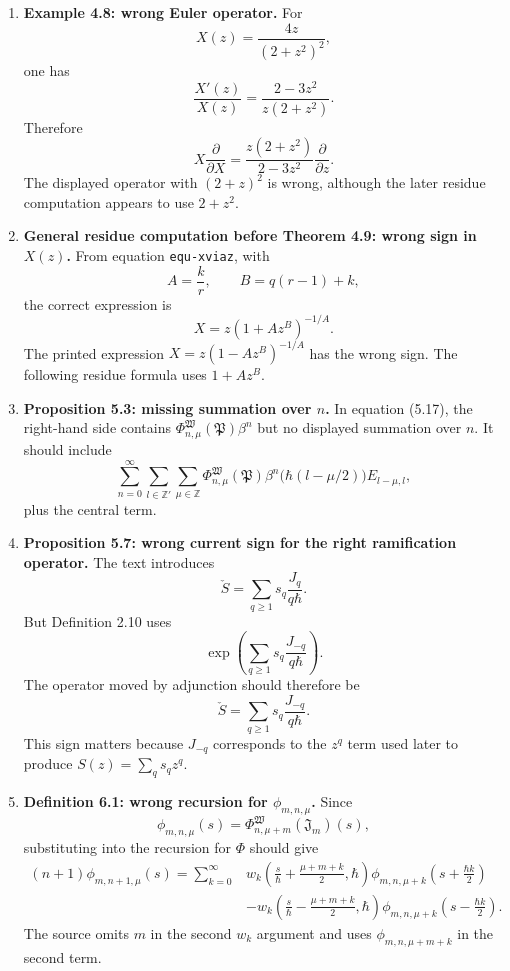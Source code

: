 \documentclass[11pt]{article}
\begin{document}
\begin{enumerate}[label=\textbf{\arabic*.}]
   \item \textbf{Example 4.8: wrong Euler operator.}
   For
   \[
      X(z)=\frac{4z}{(2+z^2)^2},
   \]
   one has
   \[
      \frac{X'(z)}{X(z)}
      =
      \frac{2-3z^2}{z(2+z^2)}.
   \]
   Therefore
   \[
      X\frac{\partial}{\partial X}
      =
      \frac{z(2+z^2)}{2-3z^2}
      \frac{\partial}{\partial z}.
   \]
   The displayed operator with $(2+z)^2$ is wrong, although the later residue computation appears to use $2+z^2$.

   \item \textbf{General residue computation before Theorem 4.9: wrong sign in $X(z)$.}
   From equation \texttt{equ-xviaz}, with
   \[
      A=\frac{k}{r},
      \qquad
      B=q(r-1)+k,
   \]
   the correct expression is
   \[
      X=z(1+Az^B)^{-1/A}.
   \]
   The printed expression $X=z(1-Az^B)^{-1/A}$ has the wrong sign.  The following residue formula uses $1+Az^B$.

   \item \textbf{Proposition 5.3: missing summation over $n$.}
   In equation (5.17), the right-hand side contains $\Phi^{\mathfrak W}_{n,\mu}(\mathfrak P)\beta^n$ but no displayed summation over $n$.  It should include
   \[
      \sum_{n=0}^{\infty}
      \sum_{l\in\mathbb Z'}
      \sum_{\mu\in\mathbb Z}
      \Phi^{\mathfrak W}_{n,\mu}(\mathfrak P)
      \beta^n
      \bigl(\hbar(l-\mu/2)\bigr)
      E_{l-\mu,l},
   \]
   plus the central term.

   \item \textbf{Proposition 5.7: wrong current sign for the right ramification operator.}
   The text introduces
   \[
      \check S
      =
      \sum_{q\ge1}s_q\frac{J_q}{q\hbar}.
   \]
   But Definition 2.10 uses
   \[
      \exp\left(\sum_{q\ge1}s_q\frac{J_{-q}}{q\hbar}\right).
   \]
   The operator moved by adjunction should therefore be
   \[
      \check S
      =
      \sum_{q\ge1}s_q\frac{J_{-q}}{q\hbar}.
   \]
   This sign matters because $J_{-q}$ corresponds to the $z^q$ term used later to produce $S(z)=\sum_qs_qz^q$.

   \item \textbf{Definition 6.1: wrong recursion for $\phi_{m,n,\mu}$.}
   Since
   \[
      \phi_{m,n,\mu}(s)
      =
      \Phi^{\mathfrak W}_{n,\mu+m}(\mathfrak J_m)(s),
   \]
   substituting into the recursion for $\Phi$ should give
   \[
   \begin{aligned}
      (n+1)\phi_{m,n+1,\mu}(s)
      =
      \sum_{k=0}^{\infty}
      & w_k\!\left(\frac{s}{\hbar}+\frac{\mu+m+k}{2},\hbar\right)
      \phi_{m,n,\mu+k}\!\left(s+\frac{\hbar k}{2}\right)
      \\
      &-
      w_k\!\left(\frac{s}{\hbar}-\frac{\mu+m+k}{2},\hbar\right)
      \phi_{m,n,\mu+k}\!\left(s-\frac{\hbar k}{2}\right).
   \end{aligned}
   \]
   The source omits $m$ in the second $w_k$ argument and uses $\phi_{m,n,\mu+m+k}$ in the second term.


\end{enumerate}
\end{document}
